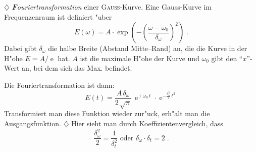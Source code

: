 \documentclass[twoside,a4paper]{book}
\newcommand{\st}[1]{{\slshape \textbf #1}}
\newcommand{\diff}{\ensuremath{\, \mathrm{d}}}
\newcommand{\E}{\ensuremath{\operatorname{e}}}
\newcommand{\I}{\ensuremath{\operatorname{i}}}
\newenvironment*{Beispiel}[0]{$\diamondsuit$\sffamily}{ \hfill $\diamondsuit$}
\begin{document}
\begin{Beispiel}
   \st{Fouriertransformation} einer \textsc{Gauss}-Kurve. Eine
   Gauss-Kurve im Frequenzenraum ist definiert "uber
   \begin{equation*}
      E(\omega) = A \cdot \exp \left ( - \left ( \frac{\omega -
              \omega_0}{\delta_\omega} \right )^2 \right ) \;.
   \end{equation*}
   Dabei gibt $\delta_\omega$ die halbe Breite (Abstand Mitte--Rand) an, die die Kurve in
   der H"ohe $E = A/\E$ hat. $A$ ist die maximale H"ohe der Kurve und
   $\omega_0$ gibt den "`$x$"'-Wert an, bei dem sich das
   Max. befindet.

   Die Fouriertransformation ist dann:
   \begin{equation*}
      E(t) = \frac{A \, \delta_\omega}{2 \, \sqrt{\pi}} \, \E^{\I \,
        \omega_0 \, t} \cdot \E^{-\frac{\delta_\omega^2}{4} \, t^2}
   \end{equation*}
   Transformiert man diese Funktion wieder zur"uck, erh"alt man die
   Ausgangsfunktion. 
\end{Beispiel}
Hier sieht man durch Koeffizientenvergleich, dass 
\begin{equation}
   \label{eq:21}
   \frac{\delta_\omega^2}{2} = \frac{1}{\delta_t^2} \text{ oder }
   \delta_\omega \cdot \delta_t = 2 \;.
\end{equation}
\end{document}
